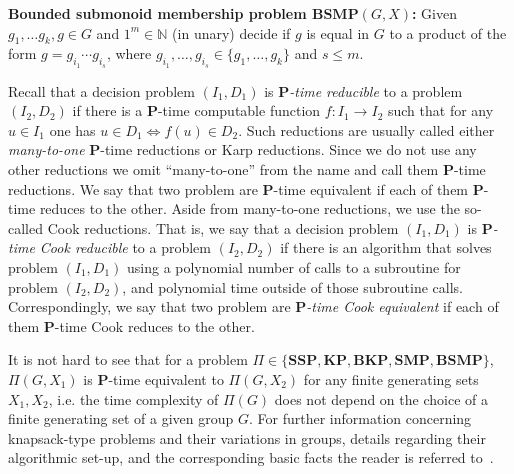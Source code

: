 \documentclass[10pt]{amsart}
\theoremstyle{definition}
\def\P{{\mathbf{P}}}
\def\SSP{{\mathbf{SSP}}}
\def\SMP{{\mathbf{SMP}}}
\def\BSMP{{\mathbf{BSMP}}}
\def\BKP{{\mathbf{BKP}}}
\def\KP{{\mathbf{KP}}}
\begin{document}
\medskip \noindent
{\bf Bounded submonoid membership problem $\BSMP(G,X)$\index{$\BSMP(G,X)$}:}
Given $g_1, \ldots g_k, g \in G$ and $1^m \in \mathbb{N}$ (in unary)
decide if $g$ is equal in $G$ to a product of the form
$g=g_{i_1}\cdots g_{i_s}$, where $g_{i_1}, \ldots, g_{i_s} \in \{g_1, \ldots, g_k\}$ and  $s\le m$.




\medskip
Recall that a decision problem $(I_1,D_1)$ is  {\em $\P$-time  reducible}
to  a problem $(I_2,D_2)$ if there is a $\P$-time computable function
$f:I_1  \to I_2$  such that for any $u \in I_1$ one has $u \in D_1 \Longleftrightarrow f(u) \in D_2$.
Such reductions are usually called either {\em many-to-one} $\P$-time reductions or Karp reductions.
Since we do not use any other reductions we omit ``many-to-one'' from the name and call them $\P$-time reductions. We say that two problem are $\P$-time equivalent if each of them $\P$-time reduces to the other. Aside from many-to-one reductions, we use the so-called Cook reductions. That is, we say that a decision problem $(I_1,D_1)$ is  {\em $\P$-time Cook  reducible} to  a problem $(I_2,D_2)$ if there is an algorithm that solves problem $(I_1,D_1)$ using a polynomial number of calls to a subroutine for problem $(I_2,D_2)$, and polynomial time outside of those subroutine calls. Correspondingly, we say that two problem are {\em $\P$-time Cook equivalent} if each of them $\P$-time Cook reduces to the other.

It is not hard to see that for a problem $\Pi\in \{\SSP, \KP, \BKP, \SMP, \BSMP\}$, $\Pi(G,X_1)$ is $\P$-time equivalent to $\Pi(G,X_2)$ for any finite generating sets $X_1,X_2$, i.e. the time complexity of $\Pi(G)$ does not depend on the choice of a finite generating set of a given group $G$.
For further information concerning knapsack-type problems and their variations in groups, details regarding their algorithmic set-up, and the corresponding basic facts the reader is referred to~\cite{MNU1}.
\end{document}
